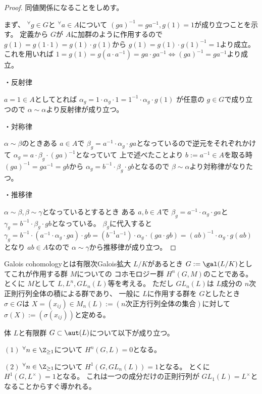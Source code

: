 \documentclass[../master_galois_theory]{subfiles}
\begin{document}
\begin{proof}
  同値関係になることをしめす。

  まず、 ${}^\forall g \in G$と ${}^\forall a \in A$について
  $(ga)^{-1} = ga^{-1} , g(1) = 1$が成り立つことを示す。
  定義から $G$が $A$に加群のように作用するので
  $g(1) = g(1 \cdot 1) = g(1) \cdot g(1)$から
  $g(1) = g(1) \cdot g(1)^{-1} = 1$より成立。
  これを用いれば $1 = g(1) = g(a \cdot a^{-1}) = ga \cdot ga^{-1} \Leftrightarrow (ga)^{-1} = ga^{-1}$より成立。

  ・反射律

  $a = 1 \in A$としてとれば
  $\alpha_g = 1 \cdot \alpha_g \cdot 1 = 1^{-1} \cdot \alpha_g \cdot g(1)$
  が任意の $g \in G$で成り立つので $\alpha \sim \alpha$より反射律が成り立つ。

  ・対称律

  $\alpha \sim \beta$のときある $a \in A$で $\beta_g = a^{-1} \cdot \alpha_g \cdot ga$となっているので逆元をそれぞれかけて
  $\alpha_g = a \cdot \beta_g \cdot (ga)^{-1}$となっていて
  上で述べたことより $b := a^{-1} \in A$を取る時 $(ga)^{-1} = ga^{-1} = gb$から
  $\alpha_g = b^{-1} \cdot \beta_g \cdot gb$となるので $\beta \sim \alpha$より対称律がなりたつ。

  ・推移律

  $\alpha \sim \beta , \beta \sim \gamma$となっているとするとき
  ある $a , b \in A$で $\beta_g = a^{-1} \cdot \alpha_g \cdot ga$と
  $\gamma_g = b^{-1} \cdot \beta_g \cdot gb$となっている。
  $\beta_g$に代入すると $\gamma_g = b^{-1} \cdot (a^{-1} \cdot \alpha_g \cdot ga) \cdot gb = (b^{-1} a^{-1}) \cdot \alpha_g \cdot (ga \cdot gb) = (ab)^{-1} \cdot \alpha_g \cdot g(ab)$となり
  $ab \in A$なので $\alpha \sim \gamma$から推移律が成り立つ。
\end{proof}

\begin{defi}
  \rm{Galois cohomology}とは有限次\rm{Galois}拡大 $L/K$があるとき
  $G := \gal(L/K)$としてこれが作用する群 $M$についての
  コホモロジー群 $H^n(G,M)$のことである。
  とくに $M$として $L , L^n , GL_n(L)$等を考える。
  ただし $GL_n(L)$は $L$成分の $n$次正則行列全体の積による群であり、
  一般に $L$に作用する群を $G$としたとき $\sigma \in G$は $X = (x_{ij}) \in M_n(L) := (n次正方行列全体の集合)$に対して
  $\sigma(X) := (\sigma(x_{ij}))$と定める。
\end{defi}

\begin{prop}
  体 $L$と有限群 $G \subset \aut(L)$について以下が成り立つ。

  $(1)$
  ${}^\forall n \in \Z_{\geq 1}$について
  $H^n(G,L) = 0$となる。

  $(2)$
  ${}^\forall n \in \Z_{\geq 1}$について
  $H^1(G,GL_n(L)) = 1$となる。
  とくに $H^1(G,L^\times) = 1$となる。
  これは一つの成分だけの正則行列が $GL_1(L) = L^\times$となることからすぐ導かれる。
\end{prop}
\end{document}
